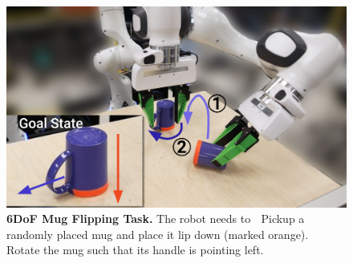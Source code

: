 \begin{figure}[t]
\centering
\includegraphics[width=0.9\linewidth]{figure/mug_task.pdf}

\vspace{1.5mm}

\caption{
\textbf{6DoF Mug Flipping Task.} 
\label{fig:mug_task}
The robot needs to 
\textcircled{} Pickup a randomly placed mug and place it lip down (marked orange).
\textcircled{} Rotate the mug such that its handle is pointing left.
}

\vspace{-4mm}
\end{figure}

